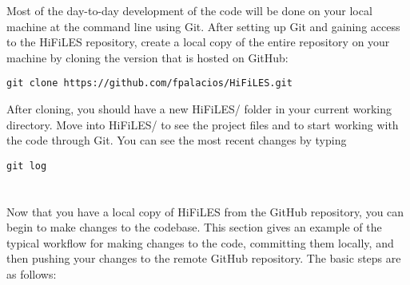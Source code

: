 \documentclass[letter,10pt]{article}
\newcommand*{\TitleFont}{%
      \usefont{\encodingdefault}{\rmdefault}{b}{n}%
      \fontsize{10}{20}%
      \selectfont}
\begin{document}
Most of the day-to-day development of the code will be done on your local machine at the command line using Git. After setting up Git and gaining access to the HiFiLES repository, create a local copy of the entire repository on your machine by cloning the version that is hosted on GitHub:
\begin{verbatim}
git clone https://github.com/fpalacios/HiFiLES.git
\end{verbatim}
After cloning, you should have a new HiFiLES/ folder in your current working directory. Move into HiFiLES/ to see the project files and to start working with the code through Git. You can see the most recent changes by typing
\begin{verbatim}
git log
\end{verbatim}

\section*{\TitleFont{Typical Workflow with Git}}

Now that you have a local copy of HiFiLES from the GitHub repository, you can begin to make changes to the codebase. This section gives an example of the typical workflow for making changes to the code, committing them locally, and then pushing your changes to the remote GitHub repository. The basic steps are as follows:
\end{document}
